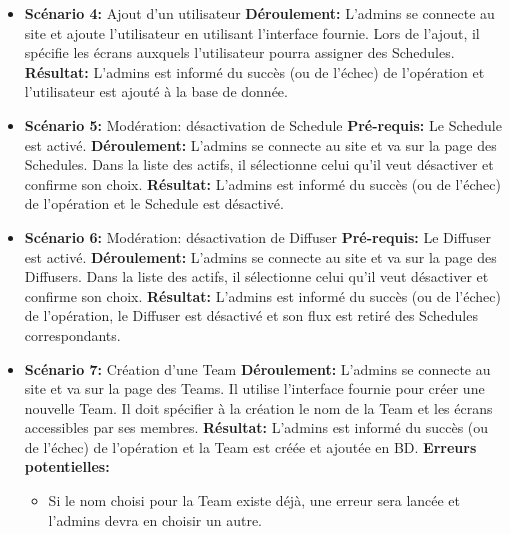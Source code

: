 \documentclass[french]{article}
\begin{document}
\begin{itemize}
		\item \textbf{Scénario 4:} Ajout d'un utilisateur\newline
		\textbf{Déroulement:} L'admins se connecte au site et ajoute l'utilisateur en utilisant l'interface fournie. Lors de l'ajout, il spécifie les écrans auxquels l'utilisateur pourra assigner des Schedules.\newline
		\textbf{Résultat:} L'admins est informé du succès (ou de l'échec) de l'opération et l'utilisateur est ajouté à la base de donnée.\newline

		\item \textbf{Scénario 5:} Modération: désactivation de Schedule\newline
		\textbf{Pré-requis:} Le Schedule est activé.\newline
		\textbf{Déroulement:} L'admins se connecte au site et va sur la page des Schedules. Dans la liste des actifs, il sélectionne celui qu'il veut désactiver et confirme son choix.\newline
		\textbf{Résultat:} L'admins est informé du succès (ou de l'échec) de l'opération et le Schedule est désactivé.\newline
		
		\item \textbf{Scénario 6:} Modération: désactivation de Diffuser\newline
		\textbf{Pré-requis:} Le Diffuser est activé.\newline
		\textbf{Déroulement:} L'admins se connecte au site et va sur la page des Diffusers. Dans la liste des actifs, il sélectionne celui qu'il veut désactiver et confirme son choix.\newline
		\textbf{Résultat:} L'admins est informé du succès (ou de l'échec) de l'opération, le Diffuser est désactivé et son flux est retiré des Schedules correspondants.\newline
		
		\item \textbf{Scénario 7:} Création d'une Team\newline
		\textbf{Déroulement:} L'admins se connecte au site et va sur la page des Teams. Il utilise l'interface fournie pour créer une nouvelle Team. Il doit spécifier à la création le nom de la Team et les écrans accessibles par ses membres. \newline
		\textbf{Résultat:} L'admins est informé du succès (ou de l'échec) de l'opération et la Team est créée et ajoutée en BD.\newline
		\textbf{Erreurs potentielles:} 
			\begin{itemize}
				\item Si le nom choisi pour la Team existe déjà, une erreur sera lancée et l'admins devra en choisir un autre.
			\end{itemize}
			

\end{itemize}
\end{document}
